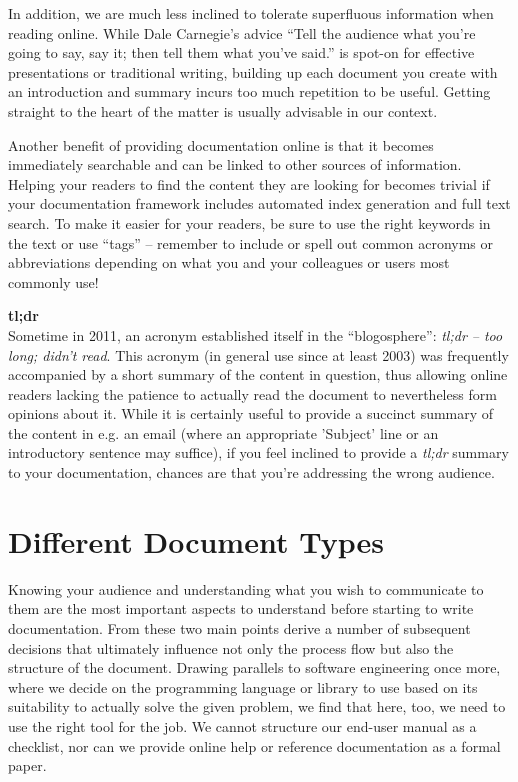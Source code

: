 In addition, we are much less inclined to tolerate
superfluous information when reading online.  While
Dale Carnegie's advice
``Tell the audience what you're going to say, say it;
then tell them what you've said.'' is spot-on for
effective presentations or traditional writing,
building up each document you create with an
introduction and summary incurs too much repetition to
be useful.  Getting straight to the heart of the
matter is usually advisable in our context.

Another benefit of providing documentation online is
that it becomes immediately searchable and can be
linked to other sources of information.  Helping your
readers to find the content they are looking for
becomes trivial if your documentation framework
includes automated index generation and full text
search.  To make it easier for your readers, be sure
to use the right keywords in the text or use ``tags''
-- remember to include or spell out common acronyms or
abbreviations depending on what you and your
colleagues or users most commonly use!

\begin{sidenote}
{\bf tl;dr} \\
Sometime in 2011, an acronym established itself in the
``blogosphere'': {\em tl;dr -- too long; didn't read}.
This acronym (in general use since at least 2003)  was
frequently accompanied by a short summary of the
content in question, thus allowing online readers
lacking the patience to actually read the document to
nevertheless form opinions about it.  While it is
certainly useful to provide a succinct summary of the
content in e.g. an email (where an appropriate
'Subject' line or an introductory sentence may
suffice), if you feel inclined to provide a {\em
tl;dr} summary to your documentation,
chances are that you're addressing the wrong
audience.
\end{sidenote}


\section{Different Document Types}
\label{documentation:types}

Knowing your audience and understanding what you wish
to communicate to them are the most important aspects
to understand before starting to write documentation.
From these two main points derive a number of
subsequent decisions that ultimately influence not
only the process flow but also the structure of the
document.  Drawing parallels to software engineering
once more, where we decide on the programming language
or library to use based on its suitability to actually
solve the given problem, we find that here, too, we
need to use the right tool for the job.  We cannot
structure our end-user manual as a checklist, nor can
we provide online help or reference documentation as a
formal paper.

